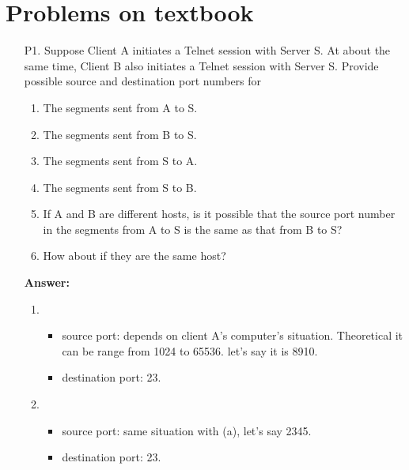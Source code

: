 \section{Problems on textbook}

\begin{enumerate}
    \item [P1.] Suppose Client A initiates a Telnet session with Server S. At about the same time, Client B also initiates a Telnet session with Server S. Provide possible source and destination port numbers for
    
    \begin{enumerate}
        \item The segments sent from A to S.
        
        \item The segments sent from B to S.
        
        \item The segments sent from S to A.
        
        \item The segments sent from S to B.
        
        \item If A and B are different hosts, is it possible that the source port number in the segments from A to S is the same as that from B to S?
        
        \item How about if they are the same host?        
    \end{enumerate}
    
    \textbf{Answer:}
    
    \begin{enumerate}
        \item \begin{itemize}
            \item source port: depends on client A's computer's situation. Theoretical it can be range from 1024 to 65536. let's say it is 8910. 
            \item destination port: 23.
        \end{itemize}
        
        \item \begin{itemize}
            \item source port: same situation with (a), let's say 2345.
            \item destination port: 23.
        \end{itemize}
        

\end{enumerate}
\end{enumerate}
